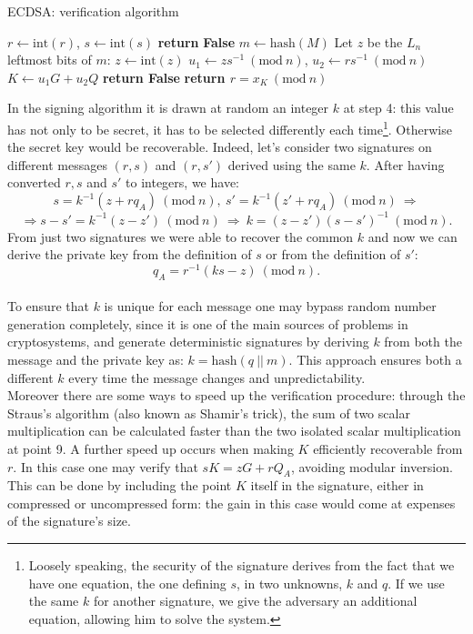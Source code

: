 \begin{algorithm}
	\caption{ECDSA: verification algorithm}
	\label{alg:ecdsa_ver}
	\begin{algorithmic}[1]
		\State $r \gets \text{int}(r)$, $s \gets \text{int}(s)$
		\State \textbf{return} {\bf False}
		\EndIf
		\State $m \gets \text{hash}(M)$
		\State Let $z$ be the $L_n$ leftmost bits of $m$: $z \gets \text{int}(z)$
		\State $u_1 \gets zs^{-1} \ (\text{mod} \ n)$, $u_2 \gets rs^{-1} \ (\text{mod} \ n)$
		\State $K \gets u_1G + u_2Q$
		\State \textbf{return False} 
		\EndIf
		\State \textbf{return $r = x_K \ (\text{mod} \ n)$}
		\EndProcedure	
	\end{algorithmic}
\end{algorithm}

\bigskip
\noindent
In the signing algorithm it is drawn at random an integer $k$ at step 4: this value has not only to be secret, it has to be selected differently each time\footnote{Loosely speaking, the security of the signature derives from the fact that we have one equation, the one defining $s$, in two unknowns, $k$ and $q$. If we use the same $k$ for another signature, we give the adversary an additional equation, allowing him to solve the system.}. Otherwise the secret key would be recoverable. Indeed, let's consider two signatures on different messages $(r, s)$ and $(r, s')$ derived using the same $k$. After having converted $r, s$ and $s'$ to integers, we have:
$$s = k^{-1}(z + rq_A) \ (\text{mod} \ n), \ s' = k^{-1}(z' + rq_A) \ (\text{mod} \ n) \ \Longrightarrow $$ $$\Longrightarrow s - s' = k^{-1}(z - z') \ (\text{mod} \ n) \ \Longrightarrow \ k = (z - z')(s - s')^{-1} \ (\text{mod} \ n).$$
From just two signatures we were able to recover the common $k$ and now we can derive the private key from the definition of $s$ or from the definition of $s'$:
$$q_A = r^{-1}(ks - z) \ (\text{mod} \ n).$$
\\
To ensure that $k$ is unique for each message one may bypass random number generation completely, since it is one of the main sources of problems in cryptosystems, and generate deterministic signatures by deriving $k$ from both the message and the private key as: $k = \text{hash}(q \ || \ m)$. This approach ensures both a different $k$ every time the message changes and unpredictability. 
\\
Moreover there are some ways to speed up the verification procedure: through the Straus's algorithm (also known as Shamir's trick), the sum of two scalar multiplication can be calculated faster than the two isolated scalar multiplication at point 9. A further speed up occurs when making $K$ efficiently recoverable from $r$. In this case one may verify that $sK = zG + rQ_A$, avoiding modular inversion. This can be done by including the point $K$ itself in the signature, either in compressed or uncompressed form: the gain in this case would come at expenses of the signature's size.

